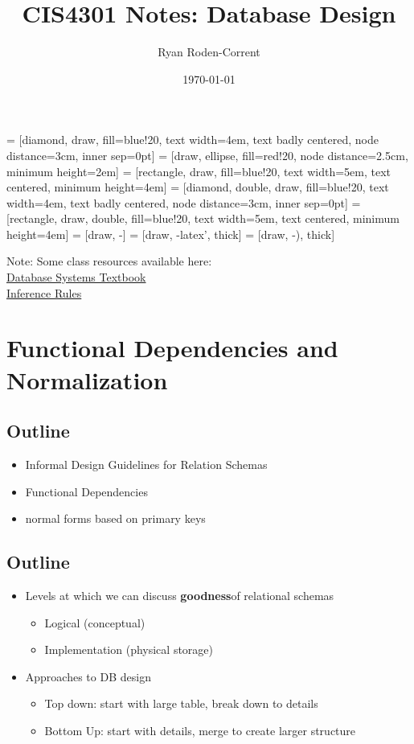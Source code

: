 \documentclass[12pt]{article}
\title{CIS4301 Notes: Database Design}
\author{Ryan Roden-Corrent}
\date{\today}
\begin{document}
\setlength\parindent{0pt}
 = [diamond, draw, fill=blue!20, text width=4em,
  text badly centered, node distance=3cm, inner sep=0pt]
 = [draw, ellipse, fill=red!20, node distance=2.5cm,
  minimum height=2em]
 = [rectangle, draw, fill=blue!20, text width=5em,
  text centered, minimum height=4em]
 = [diamond, double, draw, fill=blue!20, text width=4em,
  text badly centered, node distance=3cm, inner sep=0pt]
 = [rectangle, draw, double, fill=blue!20, text width=5em,
  text centered, minimum height=4em]
 = [draw, -]
 = [draw, -latex', thick]
 = [draw, -), thick]
\maketitle

Note: Some class resources available here:\\
\href{http://cise.ufl.edu/class/cis4301sp14/slides/fd.pdf}{Database Systems
  Textbook}\\
\href{http://cise.ufl.edu/class/cis4301sp14/slides/inference_rules.jpg}{Inference
  Rules}\\
\section{Functional Dependencies and Normalization}
\subsection{Outline}
\begin{itemize}
  \item Informal Design Guidelines for Relation Schemas
  \item Functional Dependencies
  \item normal forms based on primary keys
\end{itemize}

\subsection{Outline}
\begin{itemize}
  \item {
      Levels at which we can discuss \textbf{goodness}of relational schemas
      \begin{itemize}
        \item Logical (conceptual)
        \item Implementation (physical storage)
      \end{itemize}
    }
  \item {
      Approaches to DB design
      \begin{itemize}
        \item Top down: start with large table, break down to details
        \item Bottom Up: start with details, merge to create larger structure
      \end{itemize}
    }
\end{itemize}
\end{document}
